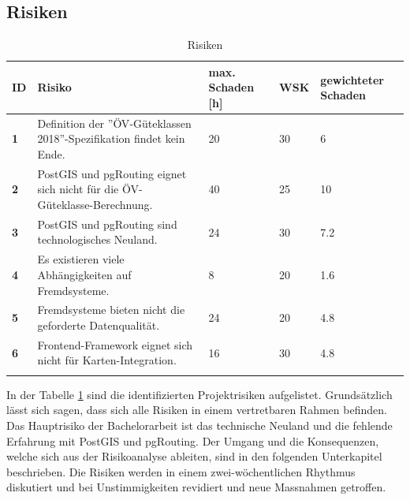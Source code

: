 \subsection{Risiken}
\label{Projektmanagement:Risiken}

\begin{longtable}{p{0.5cm} p{7cm} p{2cm} p{2cm} p{2cm}}
    \toprule
      \textbf{ID}
    & \textbf{Risiko}
    & \textbf{max. Schaden [h]}
    & \textbf{WSK}
    & \textbf{gewichteter Schaden} \\
    \midrule
    \textbf{1}
                    & Definition der ''\acs{ÖV}-Güteklassen 2018''-Spezifikation findet kein Ende.
                    & 20
                    & 30%
                    & 6 \\
    \textbf{2}
                    & PostGIS und pgRouting eignet sich nicht für die \acs{ÖV}-Güteklasse-Berechnung.
                    & 40
                    & 25%
                    & 10 \\    
    \textbf{3}
                    & PostGIS und pgRouting sind technologisches Neuland.
                    & 24
                    & 30%
                    & 7.2 \\
    \textbf{4}
                    & Es existieren viele Abhängigkeiten auf Fremdsysteme.
                    & 8
                    & 20%
                    & 1.6 \\
    \textbf{5}
                    & Fremdsysteme bieten nicht die geforderte Datenqualität.
                    & 24
                    & 20%
                    & 4.8 \\
    \textbf{6}
                    & Frontend-Framework eignet sich nicht für Karten-Integration.
                    & 16
                    & 30%
                    & 4.8 \\
    \bottomrule
    \caption{Risiken}
    \label{table:Risiken}
\end{longtable}

In der Tabelle \ref{table:Risiken} sind die identifizierten Projektrisiken aufgelistet.
Grundsätzlich lässt sich sagen, dass sich alle Risiken in einem vertretbaren Rahmen befinden.
Das Hauptrisiko der Bachelorarbeit ist das technische Neuland und die fehlende Erfahrung mit PostGIS und pgRouting.
Der Umgang und die Konsequenzen, welche sich aus der Risikoanalyse ableiten, sind in den folgenden Unterkapitel beschrieben.
Die Risiken werden in einem zwei-wöchentlichen Rhythmus diskutiert und bei Unstimmigkeiten revidiert und neue Massnahmen getroffen.

